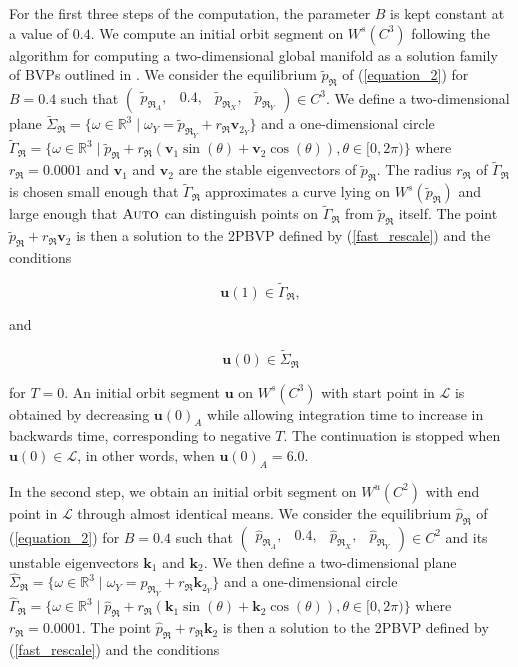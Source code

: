 \documentclass{ws-ijbc}
\begin{document}
For the first three steps of the computation, the parameter $B$ is kept constant at a value of $0.4$.  We compute an initial orbit segment on $W^{s}(C^3)$ following the algorithm for computing a two-dimensional global manifold as a solution family of BVPs outlined in \cite{Red_book}.  We consider the equilibrium $\tilde{p}_{\Re}$ of (\ref{equation_2}) for $B=0.4$ such that $\begin{pmatrix} \tilde{p}_{\Re_A},& 0.4,&\tilde{p}_{\Re_X},&\tilde{p}_{\Re_Y} \end{pmatrix} \in C^3$.  We define a two-dimensional plane $\widetilde{\Sigma}_{\Re} = \{ \omega \in \mathbb{R}^3  \; | \; \omega_Y = \tilde{p}_{\Re_Y} + r_{\Re}\mathbf{v}_{2_Y} \}$ and a one-dimensional circle $\widetilde{\Gamma}_{\Re}= \{ \omega \in \mathbb{R}^3  \; | \; \tilde{p}_{\Re} + r_{\Re}(\mathbf{v}_1\sin(\theta) + \mathbf{v}_2\cos(\theta)), \theta \in [0,2\pi) \}$  where $r_{\Re}=0.0001$ and $\mathbf{v}_1$ and $\mathbf{v}_2$ are the stable eigenvectors of $\tilde{p}_{\Re}$.  The radius $r_{\Re}$ of $\widetilde{\Gamma}_{\Re}$ is chosen small enough that $\widetilde{\Gamma}_{\Re}$ approximates a curve lying on $W^{s}(\tilde{p}_{\Re})$ and large enough that $\textsc{Auto}$ can distinguish points on $\widetilde{\Gamma}_{\Re}$ from $\tilde{p}_{\Re}$ itself.  The point $\tilde{p}_{\Re} + r_{\Re}\mathbf{v}_2$ is then a solution to the 2PBVP defined by (\ref{fast_rescale}) and the conditions

\begin{equation}
	\mathbf{u}(1) \in \widetilde{\Gamma}_{\Re},
	\label{top_end}
\end{equation}

and

\begin{equation}
	\mathbf{u}(0) \in \widetilde{\Sigma}_{\Re}
\end{equation}

\noindent
for $T=0$.  An initial orbit segment $\mathbf{u}$ on $W^{s}(C^3)$ with start point in $\mathscr{L}$ is obtained by decreasing $\mathbf{u}(0)_A$ while allowing integration time to increase in backwards time, corresponding to negative $T$.  The continuation is stopped when $\mathbf{u}(0) \in \mathscr{L}$, in other words, when $\mathbf{u}(0)_A = 6.0$.

In the second step, we obtain an initial orbit segment on $W^{u}(C^2)$ with end point in $\mathscr{L}$ through almost identical means.  We consider the equilibrium $\hat{p}_{\Re}$ of (\ref{equation_2}) for $B=0.4$ such that $\begin{pmatrix} \hat{p}_{\Re_A}, &0.4, & \hat{p}_{\Re_X}, & \hat{p}_{\Re_Y} \end{pmatrix} \in C^2$ and its unstable eigenvectors $\mathbf{k}_1$ and $\mathbf{k}_2$.  We then define a two-dimensional plane $\widehat{\Sigma}_{\Re} = \{ \omega \in \mathbb{R}^3 \; | \; \omega_Y = \hat{p}_{\Re_Y} + r_{\Re}\mathbf{k}_{2_Y}\}$ and a one-dimensional circle $\widehat{\Gamma}_{\Re} = \{ \omega \in \mathbb{R}^3  \; | \; \hat{p}_{\Re} + r_{\Re}(\mathbf{k}_1\sin(\theta) + \mathbf{k}_2\cos(\theta)), \theta \in [0,2\pi) \}$ where $r_{\Re}=0.0001$.  The point $\hat{p}_{\Re} + r_{\Re}\mathbf{k}_2$ is then a solution to the 2PBVP defined by (\ref{fast_rescale}) and the conditions
\end{document}
